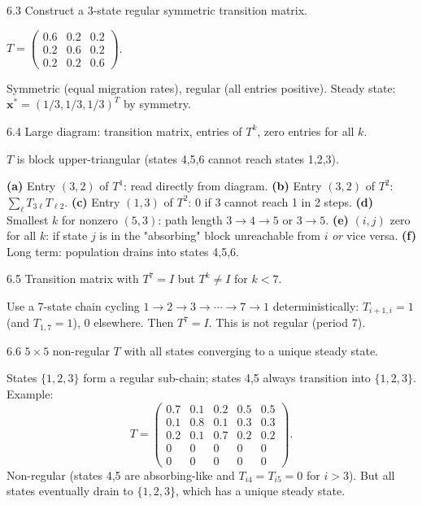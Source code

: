 \begin{exercise}{6.3}
Construct a 3-state regular symmetric transition matrix.
\end{exercise}
\begin{solution}
$T=\begin{pmatrix}0.6&0.2&0.2\\0.2&0.6&0.2\\0.2&0.2&0.6\end{pmatrix}$.

Symmetric (equal migration rates), regular (all entries positive). Steady state: $\mathbf{x}^*=(1/3,1/3,1/3)^T$ by symmetry.
\end{solution}

\begin{exercise}{6.4}
Large diagram: transition matrix, entries of $T^k$, zero entries for all $k$.
\end{exercise}
\begin{solution}
$T$ is block upper-triangular (states 4,5,6 cannot reach states 1,2,3).

\textbf{(a)} Entry $(3,2)$ of $T^1$: read directly from diagram.
\textbf{(b)} Entry $(3,2)$ of $T^2$: $\sum_\ell T_{3\ell}T_{\ell2}$.
\textbf{(c)} Entry $(1,3)$ of $T^2$: 0 if 3 cannot reach 1 in 2 steps.
\textbf{(d)} Smallest $k$ for nonzero $(5,3)$: path length $3\to4\to5$ or $3\to5$.
\textbf{(e)} $(i,j)$ zero for all $k$: if state $j$ is in the "absorbing" block unreachable from $i$ \emph{or} vice versa.
\textbf{(f)} Long term: population drains into states 4,5,6.
\end{solution}

\begin{exercise}{6.5}
Transition matrix with $T^7=I$ but $T^k\neq I$ for $k<7$.
\end{exercise}
\begin{solution}
Use a 7-state chain cycling $1\to2\to3\to\cdots\to7\to1$ deterministically:
$T_{i+1,i}=1$ (and $T_{1,7}=1$), 0 elsewhere. Then $T^7=I$. This is not regular (period 7).
\end{solution}

\begin{exercise}{6.6}
$5\times5$ non-regular $T$ with all states converging to a unique steady state.
\end{exercise}
\begin{solution}
States $\{1,2,3\}$ form a regular sub-chain; states 4,5 always transition into $\{1,2,3\}$. Example:
\[T=\begin{pmatrix}0.7&0.1&0.2&0.5&0.5\\0.1&0.8&0.1&0.3&0.3\\0.2&0.1&0.7&0.2&0.2\\0&0&0&0&0\\0&0&0&0&0\end{pmatrix}.\]
Non-regular (states 4,5 are absorbing-like and $T_{i4}=T_{i5}=0$ for $i>3$). But all states eventually drain to $\{1,2,3\}$, which has a unique steady state.
\end{solution}

